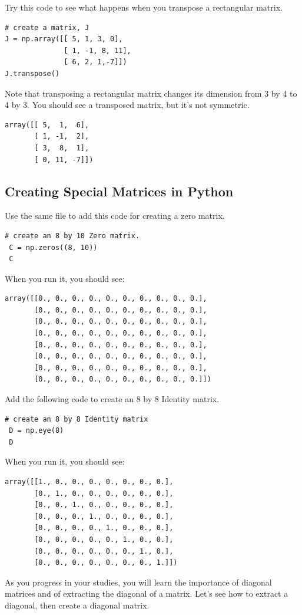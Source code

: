 Try this code to see what happens when you transpose a rectangular matrix. 
\begin{verbatim}
# create a matrix, J
J = np.array([[ 5, 1, 3, 0], 
              [ 1, -1, 8, 11], 
              [ 6, 2, 1,-7]])
J.transpose()
\end{verbatim}
Note that transposing a rectangular matrix changes its dimension from 3 by 4 to 4 by 3. You should see a transposed matrix, but it's not symmetric.
\begin{verbatim}
array([[ 5,  1,  6],
       [ 1, -1,  2],
       [ 3,  8,  1],
       [ 0, 11, -7]])
\end{verbatim}

\subsection{Creating Special Matrices in Python}
 Use the same file to add this code for creating a zero matrix.
\begin{verbatim}
# create an 8 by 10 Zero matrix.
 C = np.zeros((8, 10))
 C
\end{verbatim}
When you run it, you should see:
\begin{verbatim}
array([[0., 0., 0., 0., 0., 0., 0., 0., 0., 0.],
       [0., 0., 0., 0., 0., 0., 0., 0., 0., 0.],
       [0., 0., 0., 0., 0., 0., 0., 0., 0., 0.],
       [0., 0., 0., 0., 0., 0., 0., 0., 0., 0.],
       [0., 0., 0., 0., 0., 0., 0., 0., 0., 0.],
       [0., 0., 0., 0., 0., 0., 0., 0., 0., 0.],
       [0., 0., 0., 0., 0., 0., 0., 0., 0., 0.],
       [0., 0., 0., 0., 0., 0., 0., 0., 0., 0.]])
\end{verbatim}
Add the following code to create an 8 by 8 Identity matrix.
\begin{verbatim}
# create an 8 by 8 Identity matrix 
 D = np.eye(8)
 D
\end{verbatim}
When you run it, you should see:
\begin{verbatim}
array([[1., 0., 0., 0., 0., 0., 0., 0.],
       [0., 1., 0., 0., 0., 0., 0., 0.],
       [0., 0., 1., 0., 0., 0., 0., 0.],
       [0., 0., 0., 1., 0., 0., 0., 0.],
       [0., 0., 0., 0., 1., 0., 0., 0.],
       [0., 0., 0., 0., 0., 1., 0., 0.],
       [0., 0., 0., 0., 0., 0., 1., 0.],
       [0., 0., 0., 0., 0., 0., 0., 1.]])
\end{verbatim}
As you progress in your studies, you will learn the importance of diagonal matrices and of extracting the diagonal of a matrix. Let's see how to extract a diagonal, then create a diagonal matrix.
